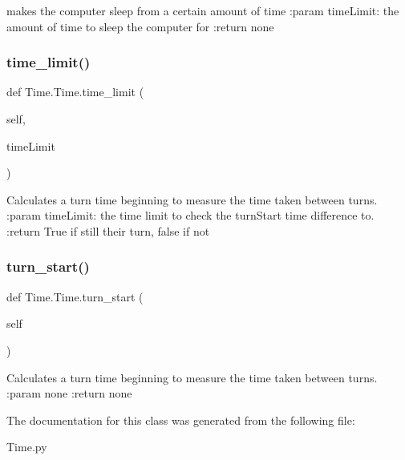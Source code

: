 \begin{DoxyVerb}makes the computer sleep from a certain amount of time
:param timeLimit: the amount of time to sleep the computer for
:return none
\end{DoxyVerb}
 \mbox{\label{class_time_1_1_time_a431f5589ccc49f1292dac1e7d9ac264f}} 
\subsubsection{\texorpdfstring{time\+\_\+limit()}{time\_limit()}}
{\footnotesize\ttfamily def Time.\+Time.\+time\+\_\+limit (\begin{DoxyParamCaption}\item[{}]{self,  }\item[{}]{time\+Limit }\end{DoxyParamCaption})}

\begin{DoxyVerb}Calculates a turn time beginning to measure the time taken between turns.
:param timeLimit: the time limit to check the turnStart time difference to.
:return True if still their turn, false if not
\end{DoxyVerb}
 \mbox{\label{class_time_1_1_time_abab694cc273962120aa1260e46634436}} 
\subsubsection{\texorpdfstring{turn\+\_\+start()}{turn\_start()}}
{\footnotesize\ttfamily def Time.\+Time.\+turn\+\_\+start (\begin{DoxyParamCaption}\item[{}]{self }\end{DoxyParamCaption})}

\begin{DoxyVerb}Calculates a turn time beginning to measure the time taken between turns.
:param none
:return none
\end{DoxyVerb}
 

The documentation for this class was generated from the following file\+:\begin{DoxyCompactItemize}
\item 
Time.\+py\end{DoxyCompactItemize}
